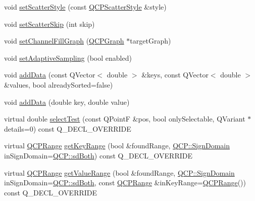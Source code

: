 \begin{DoxyCompactItemize}
\item 
void \hyperlink{classQCPGraph_a12bd17a8ba21983163ec5d8f42a9fea5}{set\+Scatter\+Style} (const \hyperlink{classQCPScatterStyle}{Q\+C\+P\+Scatter\+Style} \&style)
\item 
void \hyperlink{classQCPGraph_a17cebd3196f434258abb82ba6dc443f2}{set\+Scatter\+Skip} (int skip)
\item 
void \hyperlink{classQCPGraph_a2d03156df1b64037a2e36cfa50351ca3}{set\+Channel\+Fill\+Graph} (\hyperlink{classQCPGraph}{Q\+C\+P\+Graph} $\ast$target\+Graph)
\item 
void \hyperlink{classQCPGraph_ab468cd600160f327836aa0644291e64c}{set\+Adaptive\+Sampling} (bool enabled)
\item 
void \hyperlink{classQCPGraph_ae0555c0d3fe0fa7cb8628f88158d420f}{add\+Data} (const Q\+Vector$<$ double $>$ \&keys, const Q\+Vector$<$ double $>$ \&values, bool already\+Sorted=false)
\item 
void \hyperlink{classQCPGraph_a0bf98b1972286cfb7b1c4b7dd6ae2012}{add\+Data} (double key, double value)
\item 
virtual double \hyperlink{classQCPGraph_a6d669d04462d272c6aa0e5f85846d673}{select\+Test} (const Q\+PointF \&pos, bool only\+Selectable, Q\+Variant $\ast$details=0) const Q\+\_\+\+D\+E\+C\+L\+\_\+\+O\+V\+E\+R\+R\+I\+DE
\item 
virtual \hyperlink{classQCPRange}{Q\+C\+P\+Range} \hyperlink{classQCPGraph_aac47c6189e3aea46ea46939e5d14796c}{get\+Key\+Range} (bool \&found\+Range, \hyperlink{namespaceQCP_afd50e7cf431af385614987d8553ff8a9}{Q\+C\+P\+::\+Sign\+Domain} in\+Sign\+Domain=\hyperlink{namespaceQCP_afd50e7cf431af385614987d8553ff8a9aa38352ef02d51ddfa4399d9551566e24}{Q\+C\+P\+::sd\+Both}) const Q\+\_\+\+D\+E\+C\+L\+\_\+\+O\+V\+E\+R\+R\+I\+DE
\item 
virtual \hyperlink{classQCPRange}{Q\+C\+P\+Range} \hyperlink{classQCPGraph_a8f773e56f191a61c06e129e90a604d77}{get\+Value\+Range} (bool \&found\+Range, \hyperlink{namespaceQCP_afd50e7cf431af385614987d8553ff8a9}{Q\+C\+P\+::\+Sign\+Domain} in\+Sign\+Domain=\hyperlink{namespaceQCP_afd50e7cf431af385614987d8553ff8a9aa38352ef02d51ddfa4399d9551566e24}{Q\+C\+P\+::sd\+Both}, const \hyperlink{classQCPRange}{Q\+C\+P\+Range} \&in\+Key\+Range=\hyperlink{classQCPRange}{Q\+C\+P\+Range}()) const Q\+\_\+\+D\+E\+C\+L\+\_\+\+O\+V\+E\+R\+R\+I\+DE
\end{DoxyCompactItemize}
